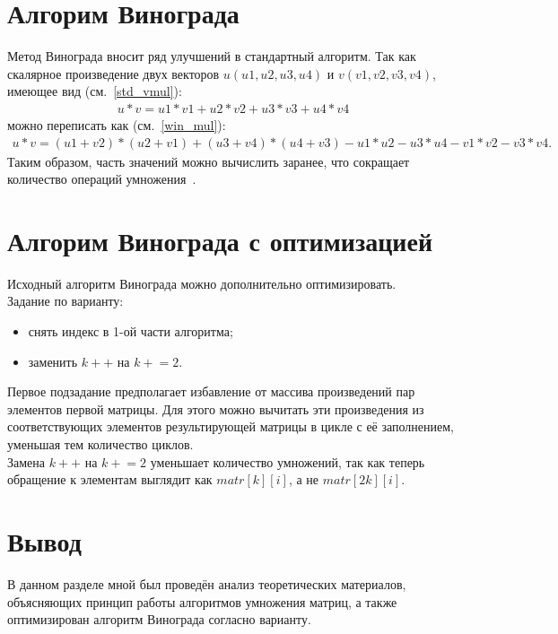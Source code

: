 \section{Алгорим Винограда}

Метод Винограда вносит ряд улучшений в стандартный алгоритм. Так как скалярное произведение двух векторов ${u(u1, u2, u3, u4)}$ и ${v(v1, v2, v3, v4)}$, имеющее вид (см.~\ref{std_vmul}):\\ 
\begin{align}
	\label{std_vmul}
	{u*v = u1*v1+u2*v2+u3*v3+u4*v4}
\end{align}
можно переписать как (см.~\ref{win_mul}):\\
\begin{align}
	\label{win_mul}
	{u*v = (u1+v2)*(u2+v1)+(u3+v4)*(u4+v3)-u1*u2-u3*u4-v1*v2-v3*v4}.
\end{align} 
Таким образом, часть значений можно вычислить заранее, что сокращает количество операций умножения~\cite{lit3}. 

\section{Алгорим Винограда с оптимизацией}

Исходный алгоритм Винограда можно дополнительно оптимизировать.\\
Задание по варианту:
\begin{itemize}
	\item снять индекс в 1-ой части алгоритма;
	\item заменить $k++$ на $k \mathrel{+}= 2$.
\end{itemize}
Первое подзадание предполагает избавление от массива произведений пар элементов первой матрицы. Для этого можно вычитать эти произведения из соответствующих элементов результирующей матрицы в цикле с её заполнением, уменьшая тем количество циклов.\\
Замена $k++$ на $k \mathrel{+}= 2$ уменьшает количество умножений, так как теперь обращение к элементам выглядит как $matr[k][i]$, а не $matr[2k][i]$.

\section*{Вывод}

В данном разделе мной был проведён анализ теоретических материалов, объясняющих принцип работы алгоритмов умножения матриц, а также оптимизирован алгоритм Винограда согласно варианту.

\clearpage
